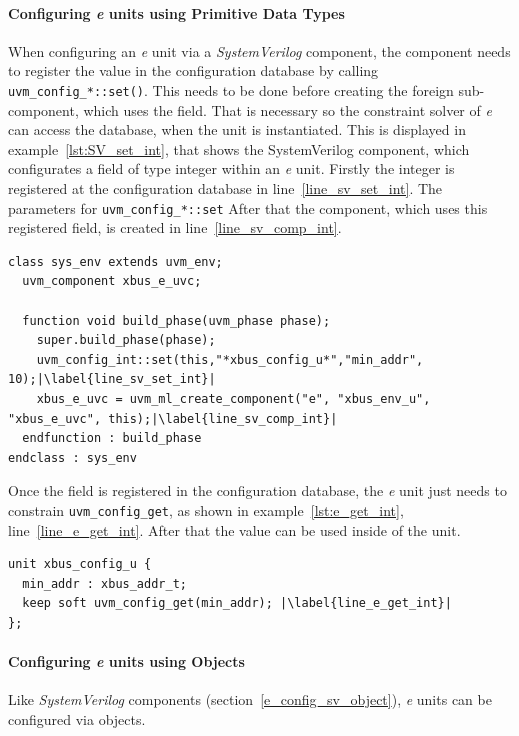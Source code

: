 \paragraph{Configuring \textit{e} units using Primitive Data Types}
When configuring an \textit{e} unit via a \emph{SystemVerilog} component, the component needs to register the value in
the configuration database by calling \lstinline$uvm_config_*::set()$. This needs to be
done before creating the foreign sub-component, which uses the field. That is necessary so the constraint solver of
\textit{e} can access the database, when the unit is instantiated. This is displayed in example~\ref{lst:SV_set_int},
that shows the SystemVerilog component, which configurates a field of type integer within an \textit{e} unit. Firstly
the integer is registered at the configuration database in line~\ref{line_sv_set_int}. The parameters for
\lstinline$uvm_config_*::set$ After that the component, which uses this registered field, is created in
line~\ref{line_sv_comp_int}.

\lstset{language=SystemVerilog, numbers = left, escapechar=|, breaklines=true}
\begin{lstlisting}[frame=htrbl, caption={SystemVerilog: register an integer in configuration database},
label={lst:SV_set_int}]
class sys_env extends uvm_env;
  uvm_component xbus_e_uvc;
  
  function void build_phase(uvm_phase phase);
    super.build_phase(phase);
    uvm_config_int::set(this,"*xbus_config_u*","min_addr", 10);|\label{line_sv_set_int}|
    xbus_e_uvc = uvm_ml_create_component("e", "xbus_env_u", "xbus_e_uvc", this);|\label{line_sv_comp_int}|
  endfunction : build_phase
endclass : sys_env
\end{lstlisting}

Once the field is registered in the configuration database, the \textit{e} unit just needs to constrain
\lstinline$uvm_config_get$, as shown in example~\ref{lst:e_get_int}, line~\ref{line_e_get_int}. After that the value can
be used inside of the unit.

\lstset{language=e, numbers = left, escapechar=|, breaklines=true}
\begin{lstlisting}[frame=htrbl, caption={e: getting an integer from configuration database}, label={lst:e_get_int}]
unit xbus_config_u {
  min_addr : xbus_addr_t;
  keep soft uvm_config_get(min_addr); |\label{line_e_get_int}|
};
\end{lstlisting}
\paragraph{Configuring \textit{e} units using Objects}
Like \emph{SystemVerilog} components (section~\ref{e_config_sv_object}), \textit{e} units can be configured via objects. 

